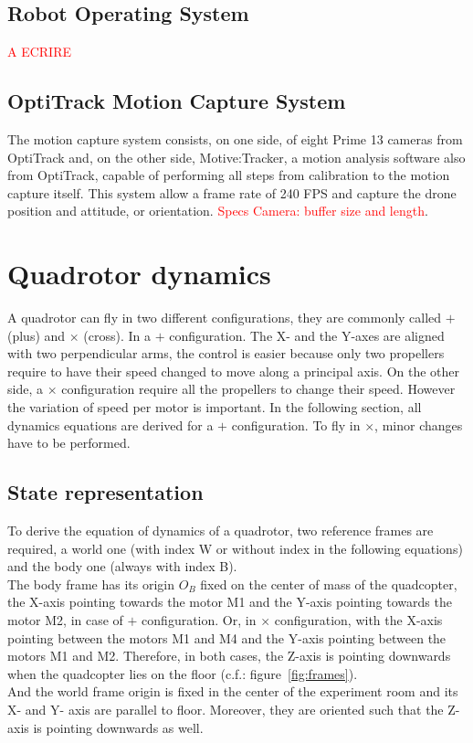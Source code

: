 \documentclass[a4paper, 12pt]{report}
\begin{document}
\subsection{Robot Operating System}
\textcolor{red}{A ECRIRE}
\subsection{OptiTrack Motion Capture System}
The motion capture system consists, on one side, of eight Prime 13 cameras from OptiTrack and, on the other side, Motive:Tracker, a motion analysis software also from OptiTrack, capable of performing all steps from calibration to the motion capture itself.
This system allow a frame rate of 240 FPS and capture the drone position and attitude, or orientation. \textcolor{red}{Specs Camera: buffer size and length}.

\newpage

\section{Quadrotor dynamics}
A quadrotor can fly in two different configurations, they are commonly called $+$ (plus) and $\times$ (cross). In a $+$ configuration. The X- and the Y-axes are aligned with two perpendicular arms, the control is easier because only two propellers require to have their speed changed to move along a principal axis. On the other side, a $\times$ configuration require all the propellers to change their speed. However the variation of speed per motor is important. In the following section, all dynamics equations are derived for a $+$ configuration. To fly in $\times$, minor changes have to be performed.

\subsection{State representation}
To derive the equation of dynamics of a quadrotor, two reference frames are required, a world one (with index W or without index in the following equations) and the body one (always with index B).\\
 The body frame has its origin $O_B$ fixed on the center of mass of the quadcopter, the X-axis pointing towards the motor M1 and the Y-axis pointing towards the motor M2, in case of $+$ configuration. Or, in $\times$ configuration, with the X-axis pointing between the motors M1 and M4 and the Y-axis pointing between the motors M1 and M2. Therefore, in both cases, the Z-axis is pointing downwards when the quadcopter lies on the floor (c.f.: figure~\ref{fig:frames}). \\
And the world frame origin is fixed in the center of the experiment room and its X- and Y- axis are parallel to floor. Moreover, they are oriented such that the Z-axis is pointing downwards as well. 
\end{document}

